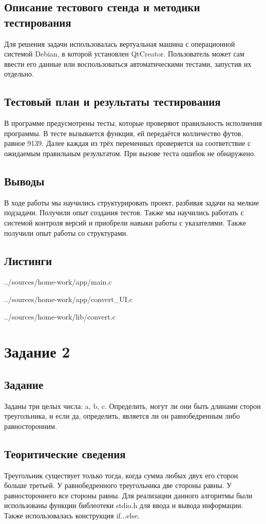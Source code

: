 \documentclass[12pt,a4paper]{report}
\begin{document}
\subsection{Описание тестового стенда и методики тестирования}
Для решения задачи использовалась вертуальная машина с операционной системой Debian, в которой установлен QtCreator. 
Пользователь может сам ввести его данные или воспользоваться автоматическими тестами, запустив их отдельно.
\subsection{Тестовый план и результаты тестирования}
В программе предусмотрены тесты, которые проверяют правильность исполнения программы. В тесте вызывается функция, ей передаётся колличество футов, равное 9139. Далее каждая из трёх переменных проверяется на соответствие с ожидаемым правильным результатом. При вызове теста ошибок не обнаружено.
\subsection{Выводы}
В ходе работы мы научились структурировать проект, разбивая задачи на мелкие подзадачи. Получили опыт создания тестов. Также мы научились работать с системой контроля версий и приобрели навыки работы с указателями. Также получили опыт работы со структурами.
\subsection*{Листинги}

{../sources/home-work/app/main.c}


{../sources/home-work/app/convert_UI.c}


{../sources/home-work/lib/convert.c}


\section{Задание 2}
\subsection{Задание}
Заданы три целых числа: a, b, c. Определить, могут ли они быть длинами сторон треугольника, и если да, определить, является ли он равнобедренным либо равносторонним.
\subsection{Теоритические сведения}
Треугольник существует только тогда, когда сумма любых двух его сторон больше третьей. У равнобедренного треугольника две стороны равны. У равностороннего все стороны равны.
Для реализации данного алгоритмы были использованы функции библеотеки stdio.h для ввода и вывода информации. Также использовалась конструкция if...else. 
\end{document}
